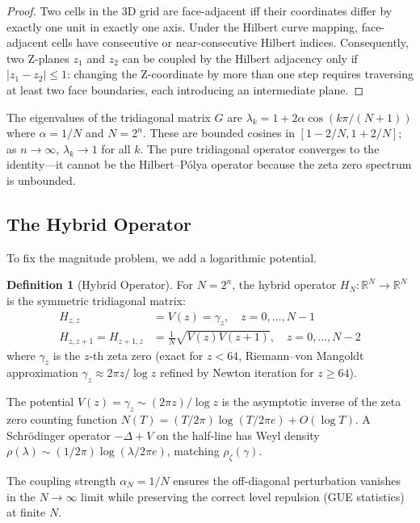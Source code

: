 \documentclass[11pt,a4paper]{article}
\theoremstyle{definition}
\newtheorem{definition}[theorem]{Definition}
\begin{document}
\begin{proof}
Two cells in the 3D grid are face-adjacent iff their coordinates
differ by exactly one unit in exactly one axis. Under the Hilbert
curve mapping, face-adjacent cells have consecutive or near-consecutive
Hilbert indices. Consequently, two Z-planes $z_1$ and $z_2$ can be
coupled by the Hilbert adjacency only if $|z_1 - z_2| \leq 1$: changing
the Z-coordinate by more than one step requires traversing at least two
face boundaries, each introducing an intermediate plane.
\end{proof}

The eigenvalues of the tridiagonal matrix $G$ are
$\lambda_k = 1 + 2\alpha\cos(k\pi/(N+1))$ where $\alpha = 1/N$ and
$N = 2^n$. These are bounded cosines in $[1-2/N, 1+2/N]$; as
$n \to \infty$, $\lambda_k \to 1$ for all $k$. The pure tridiagonal
operator converges to the identity---it cannot be the Hilbert--P\'{o}lya
operator because the zeta zero spectrum is unbounded.

\subsection{The Hybrid Operator}

To fix the magnitude problem, we add a logarithmic potential.

\begin{definition}[Hybrid Operator]\label{def:hybrid}
For $N = 2^n$, the hybrid operator $H_N: \mathbb{R}^N \to \mathbb{R}^N$
is the symmetric tridiagonal matrix:
\begin{align}
H_{z,z} &= V(z) = \gamma_z, \quad z = 0,\ldots,N-1 \\
H_{z,z+1} = H_{z+1,z} &= \frac{1}{N}\sqrt{V(z)V(z+1)}, \quad
z = 0,\ldots,N-2
\end{align}
where $\gamma_z$ is the $z$-th zeta zero (exact for $z < 64$,
Riemann--von Mangoldt approximation $\gamma_z \approx 2\pi z/\log z$
refined by Newton iteration for $z \geq 64$).
\end{definition}

The potential $V(z) = \gamma_z \sim (2\pi z)/\log z$ is the asymptotic
inverse of the zeta zero counting function
$N(T) = (T/2\pi)\log(T/2\pi e) + O(\log T)$.
A Schr\"{o}dinger operator $-\Delta + V$ on the half-line has Weyl
density $\rho(\lambda) \sim (1/2\pi)\log(\lambda/2\pi e)$,
matching $\rho_\zeta(\gamma)$.

The coupling strength $\alpha_N = 1/N$ ensures the off-diagonal
perturbation vanishes in the $N \to \infty$ limit while preserving
the correct level repulsion (GUE statistics) at finite $N$.
\end{document}
